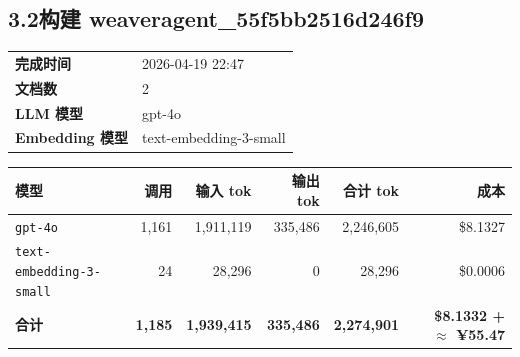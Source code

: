 \documentclass[11pt]{article}
\begin{document}
\subsection*{3.2\;构建 weaveragent\_55f5bb2516d246f9}
\noindent\begin{minipage}{\textwidth}
\begin{tabular}{@{}ll@{}}
\textbf{完成时间} & 2026-04-19 22:47 \\
\textbf{文档数} & 2 \\
\textbf{LLM 模型} & gpt-4o \\
\textbf{Embedding 模型} & text-embedding-3-small \\
\end{tabular}
\end{minipage}
\par\vspace{0.25cm}
\noindent\begin{tabularx}{\textwidth}{@{}X r r r r r@{}}
\toprule
\rowcolor{headerbg!10}\textbf{模型} & \textbf{调用} & \textbf{输入 tok} & \textbf{输出 tok} & \textbf{合计 tok} & \textbf{成本} \\
\midrule
\rowcolor{rowalt}\texttt{\small gpt-4o} & 1{,}161 & 1{,}911{,}119 & 335{,}486 & 2{,}246{,}605 & \$8.1327 \\
\texttt{\small text-embedding-3-small} & 24 & 28{,}296 & 0 & 28{,}296 & \$0.0006 \\
\midrule
\rowcolor{headerbg!15}\textbf{合计} & \textbf{1{,}185} & \textbf{1{,}939{,}415} & \textbf{335{,}486} & \textbf{2{,}274{,}901} & \textbf{\$8.1332 + $\approx$ ¥55.47} \\
\bottomrule
\end{tabularx}
\vspace{0.5cm}
\end{document}
